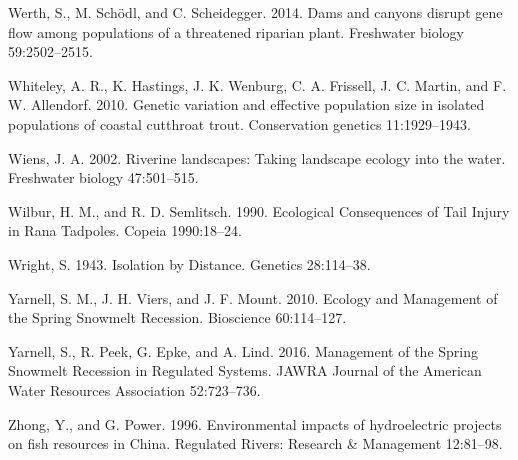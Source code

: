 \documentclass[twoside,12pt,final]{ucthesis-CA2012} %
\begin{document}
\begin{ucmainmatter}
\leavevmode\hypertarget{ref-werth_dams_2014}{}%
Werth, S., M. Schödl, and C. Scheidegger. 2014. Dams and canyons disrupt
gene flow among populations of a threatened riparian plant. Freshwater
biology 59:2502--2515.

\leavevmode\hypertarget{ref-whiteley_genetic_2010}{}%
Whiteley, A. R., K. Hastings, J. K. Wenburg, C. A. Frissell, J. C.
Martin, and F. W. Allendorf. 2010. Genetic variation and effective
population size in isolated populations of coastal cutthroat trout.
Conservation genetics 11:1929--1943.

\leavevmode\hypertarget{ref-wiens_riverine_2002}{}%
Wiens, J. A. 2002. Riverine landscapes: Taking landscape ecology into
the water. Freshwater biology 47:501--515.

\leavevmode\hypertarget{ref-wilbur_ecological_1990}{}%
Wilbur, H. M., and R. D. Semlitsch. 1990. Ecological Consequences of
Tail Injury in Rana Tadpoles. Copeia 1990:18--24.

\leavevmode\hypertarget{ref-wright_isolation_1943}{}%
Wright, S. 1943. Isolation by Distance. Genetics 28:114--38.

\leavevmode\hypertarget{ref-yarnell_ecology_2010}{}%
Yarnell, S. M., J. H. Viers, and J. F. Mount. 2010. Ecology and
Management of the Spring Snowmelt Recession. Bioscience 60:114--127.

\leavevmode\hypertarget{ref-yarnell_management_2016}{}%
Yarnell, S., R. Peek, G. Epke, and A. Lind. 2016. Management of the
Spring Snowmelt Recession in Regulated Systems. JAWRA Journal of the
American Water Resources Association 52:723--736.

\leavevmode\hypertarget{ref-zhong_environmental_1996}{}%
Zhong, Y., and G. Power. 1996. Environmental impacts of hydroelectric
projects on fish resources in China. Regulated Rivers: Research \&
Management 12:81--98.

\end{ucmainmatter}
\end{document}
